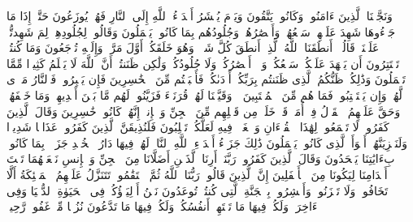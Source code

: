\stopbuffer
\startbuffer[\q:41:18]
وَنَجَّیۡنَا ٱلَّذِینَ ءَامَنُوا۟ وَكَانُوا۟ یَتَّقُونَ%
\stopbuffer
\startbuffer[\q:41:19]
وَیَوۡمَ یُحۡشَرُ أَعۡدَاۤءُ ٱللَّهِ إِلَى ٱلنَّارِ فَهُمۡ یُوزَعُونَ%
\stopbuffer
\startbuffer[\q:41:20]
حَتَّىٰۤ إِذَا مَا جَاۤءُوهَا شَهِدَ عَلَیۡهِمۡ سَمۡعُهُمۡ وَأَبۡصَٰرُهُمۡ وَجُلُودُهُم بِمَا كَانُوا۟ یَعۡمَلُونَ%
\stopbuffer
\startbuffer[\q:41:21]
وَقَالُوا۟ لِجُلُودِهِمۡ لِمَ شَهِدتُّمۡ عَلَیۡنَاۖ قَالُوۤا۟ أَنطَقَنَا ٱللَّهُ ٱلَّذِیۤ أَنطَقَ كُلَّ شَیۡءࣲۚ وَهُوَ خَلَقَكُمۡ أَوَّلَ مَرَّةࣲ وَإِلَیۡهِ تُرۡجَعُونَ%
\stopbuffer
\startbuffer[\q:41:22]
وَمَا كُنتُمۡ تَسۡتَتِرُونَ أَن یَشۡهَدَ عَلَیۡكُمۡ سَمۡعُكُمۡ وَلَاۤ أَبۡصَٰرُكُمۡ وَلَا جُلُودُكُمۡ وَلَٰكِن ظَنَنتُمۡ أَنَّ ٱللَّهَ لَا یَعۡلَمُ كَثِیرࣰا مِّمَّا تَعۡمَلُونَ%
\stopbuffer
\startbuffer[\q:41:23]
وَذَٰلِكُمۡ ظَنُّكُمُ ٱلَّذِی ظَنَنتُم بِرَبِّكُمۡ أَرۡدَىٰكُمۡ فَأَصۡبَحۡتُم مِّنَ ٱلۡخَٰسِرِینَ%
\stopbuffer
\startbuffer[\q:41:24]
فَإِن یَصۡبِرُوا۟ فَٱلنَّارُ مَثۡوࣰى لَّهُمۡۖ وَإِن یَسۡتَعۡتِبُوا۟ فَمَا هُم مِّنَ ٱلۡمُعۡتَبِینَ%
\stopbuffer
\startbuffer[\q:41:25]
۞ وَقَیَّضۡنَا لَهُمۡ قُرَنَاۤءَ فَزَیَّنُوا۟ لَهُم مَّا بَیۡنَ أَیۡدِیهِمۡ وَمَا خَلۡفَهُمۡ وَحَقَّ عَلَیۡهِمُ ٱلۡقَوۡلُ فِیۤ أُمَمࣲ قَدۡ خَلَتۡ مِن قَبۡلِهِم مِّنَ ٱلۡجِنِّ وَٱلۡإِنسِۖ إِنَّهُمۡ كَانُوا۟ خَٰسِرِینَ%
\stopbuffer
\startbuffer[\q:41:26]
وَقَالَ ٱلَّذِینَ كَفَرُوا۟ لَا تَسۡمَعُوا۟ لِهَٰذَا ٱلۡقُرۡءَانِ وَٱلۡغَوۡا۟ فِیهِ لَعَلَّكُمۡ تَغۡلِبُونَ%
\stopbuffer
\startbuffer[\q:41:27]
فَلَنُذِیقَنَّ ٱلَّذِینَ كَفَرُوا۟ عَذَابࣰا شَدِیدࣰا وَلَنَجۡزِیَنَّهُمۡ أَسۡوَأَ ٱلَّذِی كَانُوا۟ یَعۡمَلُونَ%
\stopbuffer
\startbuffer[\q:41:28]
ذَٰلِكَ جَزَاۤءُ أَعۡدَاۤءِ ٱللَّهِ ٱلنَّارُۖ لَهُمۡ فِیهَا دَارُ ٱلۡخُلۡدِ جَزَاۤءَۢ بِمَا كَانُوا۟ بِءَایَٰتِنَا یَجۡحَدُونَ%
\stopbuffer
\startbuffer[\q:41:29]
وَقَالَ ٱلَّذِینَ كَفَرُوا۟ رَبَّنَاۤ أَرِنَا ٱلَّذَیۡنِ أَضَلَّانَا مِنَ ٱلۡجِنِّ وَٱلۡإِنسِ نَجۡعَلۡهُمَا تَحۡتَ أَقۡدَامِنَا لِیَكُونَا مِنَ ٱلۡأَسۡفَلِینَ%
\stopbuffer
\startbuffer[\q:41:30]
إِنَّ ٱلَّذِینَ قَالُوا۟ رَبُّنَا ٱللَّهُ ثُمَّ ٱسۡتَقَٰمُوا۟ تَتَنَزَّلُ عَلَیۡهِمُ ٱلۡمَلَٰۤئِكَةُ أَلَّا تَخَافُوا۟ وَلَا تَحۡزَنُوا۟ وَأَبۡشِرُوا۟ بِٱلۡجَنَّةِ ٱلَّتِی كُنتُمۡ تُوعَدُونَ%
\stopbuffer
\startbuffer[\q:41:31]
نَحۡنُ أَوۡلِیَاۤؤُكُمۡ فِی ٱلۡحَیَوٰةِ ٱلدُّنۡیَا وَفِی ٱلۡءَاخِرَةِۖ وَلَكُمۡ فِیهَا مَا تَشۡتَهِیۤ أَنفُسُكُمۡ وَلَكُمۡ فِیهَا مَا تَدَّعُونَ%
\stopbuffer
\startbuffer[\q:41:32]
نُزُلࣰا مِّنۡ غَفُورࣲ رَّحِیمࣲ%
\stopbuffer
